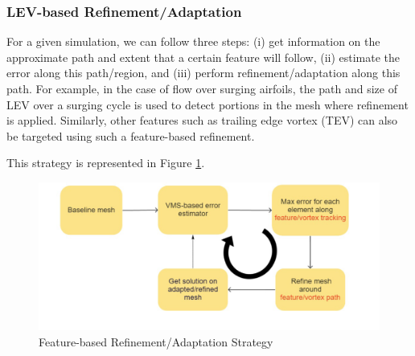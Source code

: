 \subsubsection{LEV-based Refinement/Adaptation}

For a given simulation, we can follow three steps: (i) get information on the approximate path and extent that a certain feature will follow, (ii) estimate the error along this path/region, and (iii) perform refinement/adaptation along this path.
For example, in the case of flow over surging airfoils, the path and size of LEV over a surging cycle is used to detect portions in the mesh where refinement is applied.
Similarly, other features such as trailing edge vortex (TEV) can also be targeted using such a feature-based refinement.


This strategy is represented in Figure \ref{fig:feature_based_strat}.

\begin{figure}[H]
	\centering
	\includegraphics[width=1\textwidth]{figures/adapt_strat/feature_based.png}
	\caption{Feature-based Refinement/Adaptation Strategy}
	\label{fig:feature_based_strat}
\end{figure}


